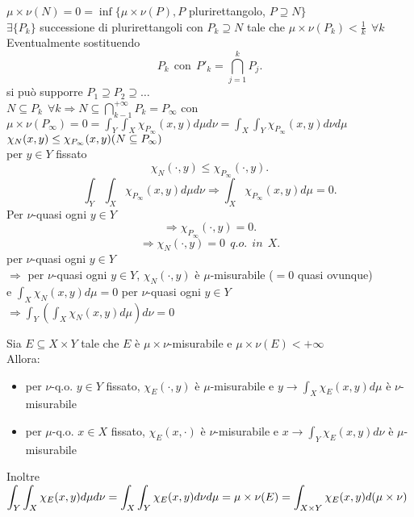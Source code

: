 \documentclass[12px]{article}
\begin{document}
 \begin{dimo}
	 $\mu\times\nu(N) = 0 = \inf\{\mu\times\nu (P), P$ plurirettangolo,  $P\supseteq N\}$ \\
	 $\exists \{P_k\}$ successione di plurirettangoli con  $P_k\supseteq N$ tale che  $\mu\times\nu (P_k) < \frac 1k \ \ \forall k$\\
	 Eventualmente sostituendo
	  \[
		  P_k \ \ \text{con} \ \ P'_k = \bigcap^{k}_{j=1}P_j
	 .\]  
	 si può supporre $P_1\supseteq P_2\supseteq\ldots$\\
	 $\displaystyle N\subseteq P_k \ \ \forall k \Rightarrow  N\subseteq \bigcap^{+\infty}_{k-1}P_k = P_\infty$ con $\displaystyle\mu\times\nu (P_\infty) = 0= \int_Y\int_X \chi_{P_\infty}(x,y)d\mu d\nu = \int_X\int_Y\chi_{P_\infty}(x,y)d\nu d\mu$\\
 $\chi_N(x,y)\leq \chi_{P_\infty}(x,y)\hfill (N\subseteq P_\infty)$ \\
 per $y\in Y$ fissato
  \[
	  \chi_N(\cdot, y)\leq \chi_{P_\infty}(\cdot, y)
 .\] 
 \[
	 \int_Y\int_X \chi_{P_\infty}(x,y)d\mu d\nu \Rightarrow \int_X\chi_{P_\infty}(x,y)d\mu = 0
 .\]  Per $\nu$-quasi ogni $y\in Y$\\
  \[
	  \Rightarrow \chi_{P_\infty}(\cdot, y) =0 
 .\] 
 \[
  \Rightarrow  \chi_N(\cdot, y) =0 \ \ q.o.\ \ in \ \ X
 .\] 
 per $\nu$-quasi ogni $y\in Y$\\
  $ \Rightarrow $ per $\nu$-quasi ogni $y\in Y$,  $\chi_N(\cdot, y)$ è  $\mu$-misurabile ($ =0$ quasi ovunque)\\
  e  $\displaystyle\int_X\chi_N(x,y) d\mu = 0 $ per  $\nu$-quasi ogni $y\in Y$\\
   $\displaystyle \Rightarrow  \int_Y(\int_X\chi_N(x,y)d\mu)d\nu = 0$
 
 \end{dimo}
 \begin{prop}
 	Sia $E\subseteq X\times Y$ tale che  $E$ è  $\mu\times\nu$-misurabile e  $\mu\times\nu(E) < +\infty$\\
	Allora:
	\begin{itemize}
		\item 	per $\nu$-q.o. $y\in Y$ fissato,  $\chi_E(\cdot,y)$ è  $\mu$-misurabile e $y \rightarrow \int_X\chi_E(x,y)d\mu$ è $\nu$-misurabile
		\item per $\mu$-q.o. $x\in X$ fissato,  $\chi_E(x,\cdot)$ è $\nu$-misurabile e $ x \rightarrow \int_Y\chi_E(x,y)d\nu$ è  $\mu$-misurabile
	\end{itemize}
	Inoltre $\displaystyle\int_Y\int_X\chi_E(x,y)d\mu d\nu = \int_X\int_Y\chi_E(x,y)d\nu d\mu \\= \mu\times\nu(E) = \int_{X\times Y}\chi_E(x,y)d(\mu\times\nu)$
 \end{prop}
\end{document}
